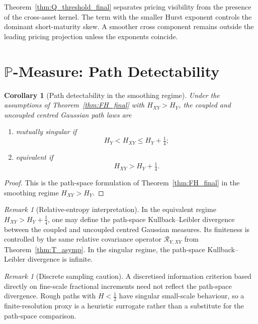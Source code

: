 \documentclass[11pt,a4paper]{amsart}
\theoremstyle{plain}
\newtheorem{corollary}[theorem]{Corollary}
\theoremstyle{definition}
\theoremstyle{remark}
\newtheorem{remark}[theorem]{Remark}
\newcommand{\PP}{\mathbb{P}}
\begin{document}
\medskip

Theorem~\ref{thm:Q_threshold_final} separates pricing visibility from the presence of the
cross-asset kernel.  The term with the smaller Hurst exponent controls the dominant short-maturity
skew.  A smoother cross component remains outside the leading pricing projection unless the
exponents coincide.

\section[\texorpdfstring{\(\PP\)-Measure: Path Detectability}{P-Measure: Path Detectability}]{\texorpdfstring{\(\PP\)-Measure: Path Detectability}{P-Measure: Path Detectability}}\label{sec:Pmeasure}

\begin{corollary}[Path detectability in the smoothing regime]\label{cor:pathdetect}
Under the assumptions of Theorem~\ref{thm:FH_final} with $H_{XY}>H_Y$, the coupled and uncoupled centred Gaussian path laws are
\begin{enumerate}[label=(\roman*)]
\item mutually singular if
\[
H_Y<H_{XY}\le H_Y+\tfrac14;
\]
\item equivalent if
\[
H_{XY}>H_Y+\tfrac14.
\]
\end{enumerate}
\end{corollary}

\begin{proof}
This is the path-space formulation of Theorem~\ref{thm:FH_final} in the smoothing regime $H_{XY}>H_Y$.
\end{proof}

\begin{remark}[Relative-entropy interpretation]\label{rem:KL}
In the equivalent regime \(H_{XY}>H_Y+\tfrac14\), one may define the path-space
Kullback--Leibler divergence between the coupled and uncoupled centred Gaussian measures.  Its
finiteness is controlled by the same relative covariance operator \(\mathcal R_{Y,XY}\) from
Theorem~\ref{thm:T_asymp}.  In the singular regime, the path-space Kullback--Leibler divergence is
infinite.
\end{remark}

\begin{remark}[Discrete sampling caution]
A discretised information criterion based directly on fine-scale fractional increments need not
reflect the path-space divergence.  Rough paths with $H<\tfrac12$ have singular small-scale
behaviour, so a finite-resolution proxy is a heuristic surrogate rather than a substitute for the
path-space comparison.
\end{remark}
\end{document}
